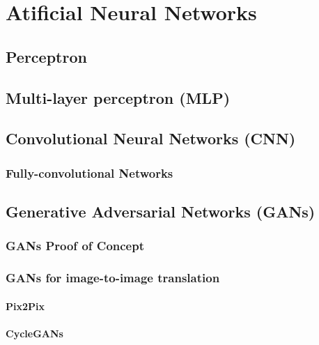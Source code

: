 \hypertarget{atificial-neural-networks}{%
\section{Atificial Neural Networks}\label{atificial-neural-networks}}

\hypertarget{perceptron}{%
\subsection{Perceptron}\label{perceptron}}

\hypertarget{multi-layer-perceptron-mlp}{%
\subsection{Multi-layer perceptron
(MLP)}\label{multi-layer-perceptron-mlp}}

\hypertarget{convolutional-neural-networks-cnn}{%
\subsection{Convolutional Neural Networks
(CNN)}\label{convolutional-neural-networks-cnn}}

\hypertarget{fully-convolutional-networks}{%
\subsubsection{Fully-convolutional
Networks}\label{fully-convolutional-networks}}

\hypertarget{generative-adversarial-networks-gans}{%
\subsection{Generative Adversarial Networks
(GANs)}\label{generative-adversarial-networks-gans}}

\hypertarget{gans-proof-of-concept}{%
\subsubsection{GANs Proof of Concept}\label{gans-proof-of-concept}}

\hypertarget{gans-for-image-to-image-translation}{%
\subsubsection{GANs for image-to-image
translation}\label{gans-for-image-to-image-translation}}

\hypertarget{pix2pix}{%
\paragraph{Pix2Pix}\label{pix2pix}}

\hypertarget{cyclegans}{%
\paragraph{CycleGANs}\label{cyclegans}}
